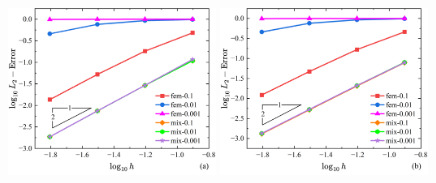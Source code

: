 \begin{figure}[!h]
    \centering
    \begin{subcaptiongroup}
    \includegraphics[width=0.49\textwidth]{figures/shearlocking/T3-l2-h.png}
    \label{T3-l2-h}
    \includegraphics[width=0.49\textwidth]{figures/shearlocking/Q4-l2-h.png}
    \label{Q4-l2-h}
    \end{subcaptiongroup}
\caption{}
\label{ch_5:fig:linear-l2}
\end{figure}
